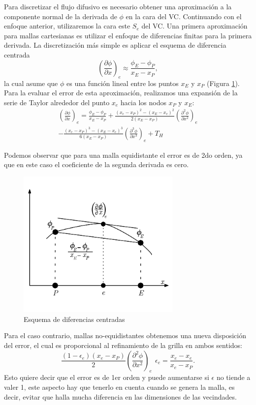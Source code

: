 \documentclass[a4paper,10pt, oneside]{book}
\begin{document}
Para discretizar el flujo difusivo es necesario obtener una aproximación a la componente normal de la derivada de $\phi$ en la cara del VC. Continuando con el enfoque anterior, utilizaremos la cara este $S_e$ del VC. Una primera aproximación para mallas cartesianas es utilizar el enfoque de diferencias finitas para la primera derivada. La discretización más simple es aplicar el esquema de diferencia centrada
\begin{equation}
	\left( \frac{\partial \phi}{\partial x} \right)_e \approx \frac{\phi_E - \phi_P}{x_E - x_P},
	\label{eq:4.9}
\end{equation}
la cual asume que $\phi$ es una función lineal entre los puntos $x_E$ y $x_P$ (Figura \ref{img:4-12}). Para la evaluar el error de esta aproximación, realizamos una expansión de la serie de Taylor alrededor del punto $x_e$ hacia los nodos $x_P$ y $x_E$:
\begin{eqnarray}
	\left( \frac{\partial \phi}{\partial x} \right)_e =  \frac{\phi_E - \phi_P}{x_E - x_P} + \frac{(x_e - x_P)^2-(x_E -x_e)^2}{2(x_E -x_P)} \left( \frac{\partial^2 \phi}{\partial x^2} \right)_e \nonumber \\ 
	- \frac{(x_e - x_P)^3-(x_E -x_e)^3}{6(x_E -x_P)} \left( \frac{\partial^3 \phi}{\partial x^3} \right)_e + T_H
\end{eqnarray}

Podemos observar que para una malla equidistante el error es de 2do orden, ya que en este caso el coeficiente de la segunda derivada es cero. 
\begin{figure}[h!]
	\centering
	\includegraphics[width=8cm]{Img/4-12}
	\caption{Esquema de diferencias centradas}
	\label{img:4-12}
\end{figure}
Para el caso contrario, mallas no-equidistantes obtenemos una nueva disposición del error, el cual es proporcional al refinamiento de la grilla en ambos sentidos:
\begin{equation}
	\frac{(1-\epsilon_e)(x_e - x_P)}{2} \left( \frac{\partial^2 \phi}{\partial x^2} \right)_e \ \ \epsilon_e = \frac{x_e - x_e}{x_e - x_P}.
\end{equation}
Esto quiere decir que el error es de 1er orden y puede aumentarse si $\epsilon$ no tiende a valer 1, este aspecto hay que tenerlo en cuenta cuando se genera la malla, es decir, evitar que halla mucha diferencia en las dimensiones de las vecindades.
\end{document}
